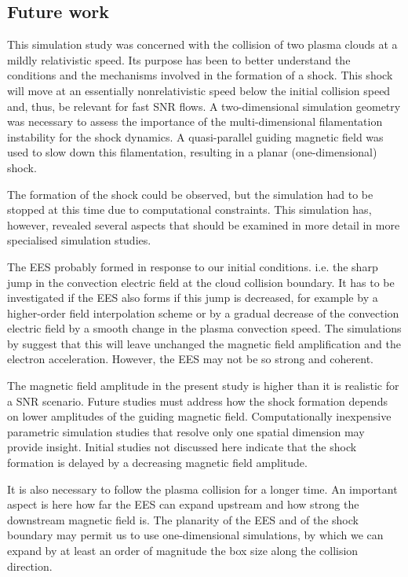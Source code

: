 \documentclass[structabstract]{aa}
\begin{document}
\subsection{Future work}

This simulation study was concerned with the collision of two plasma clouds 
at a mildly relativistic speed. Its purpose has been to better understand
the conditions and the mechanisms involved in the formation of a shock.
This shock will move at an essentially nonrelativistic speed below the 
initial collision speed and, thus, be relevant for fast SNR flows. A 
two-dimensional simulation geometry was necessary to assess the importance
of the multi-dimensional filamentation instability for the shock dynamics.
A quasi-parallel guiding magnetic field was used to slow down this
filamentation, resulting in a planar (one-dimensional) shock. 

The formation of the shock could be observed, but the simulation had to
be stopped at this time due to computational constraints. This
simulation has, however, revealed several aspects that should be examined
in more detail in more specialised simulation studies. 

The EES probably formed in response to our initial conditions. i.e. the
sharp jump in the convection electric field at the cloud collision boundary.
It has to be investigated if the EES also forms if this jump is decreased,
for example by a higher-order field interpolation scheme or by a gradual
decrease of the convection electric field by a smooth change in the plasma
convection speed. The simulations by \citet{Oblique1,Oblique2} suggest
that this will leave unchanged the magnetic field amplification and the
electron acceleration. However, the EES may not be so strong and coherent.

The magnetic field amplitude in the present study is higher than it is 
realistic for a SNR scenario. Future studies must address how the shock 
formation depends on lower amplitudes of the guiding magnetic field. 
Computationally inexpensive parametric simulation studies that resolve 
only one spatial dimension may provide insight. Initial studies not discussed 
here indicate that the shock formation is delayed by a decreasing magnetic 
field amplitude.

It is also necessary to follow the plasma collision for a longer time. An
important aspect is here how far the EES can expand upstream and how
strong the downstream magnetic field is. The planarity of the EES and of
the shock boundary may permit us to use one-dimensional simulations, by
which we can expand by at least an order of magnitude the box size along 
the collision direction. 
\end{document}
